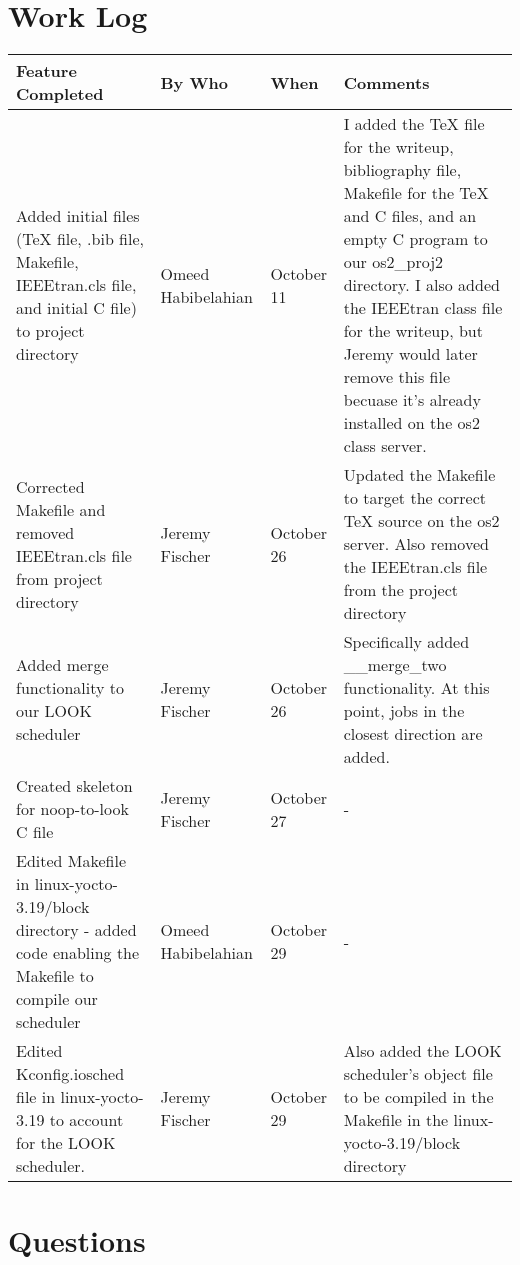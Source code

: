 \documentclass[draftclsnofoot, onecolumn, 10pt, compsoc]{IEEEtran}
\begin{document}
	\section{Work Log}
		\begin{tabular}{| p{4cm} | p{3cm} | p{2cm} | p{8cm} |}
			\hline
			Feature Completed & By Who & When & Comments \\ \hline

			Added initial files (TeX file, .bib file, Makefile, IEEEtran.cls file, and initial C file) to project directory
			& Omeed Habibelahian
			& October 11
			& I added the TeX file for the writeup, bibliography file, Makefile for the TeX and C files, and an empty C
			program to our os2\_proj2 directory. I also added the IEEEtran class file for the writeup, but Jeremy would later
			remove this file becuase it's already installed on the os2 class server.\\
			\hline

			Corrected Makefile and removed IEEEtran.cls file from project directory
			& Jeremy Fischer
			& October 26
			& Updated the Makefile to target the correct TeX source on the os2 server. Also removed the IEEEtran.cls file
			from the project directory \\
			\hline

			Added merge functionality to our LOOK scheduler
			& Jeremy Fischer
			& October 26
			& Specifically added \_\_merge\_two functionality. At this point, jobs in the closest direction are added. \\
			\hline

			Created skeleton for noop-to-look C file
			& Jeremy Fischer
			& October 27
			& - \\
			\hline

			Edited Makefile in linux-yocto-3.19/block directory - added code enabling the Makefile to compile our scheduler
			& Omeed Habibelahian
			& October 29
			& - \\
			\hline

			Edited Kconfig.iosched file in linux-yocto-3.19 to account for the LOOK scheduler.
			& Jeremy Fischer
			& October 29
			& Also added the LOOK scheduler's object file to be compiled in the Makefile in the linux-yocto-3.19/block directory \\
			\hline


		\end{tabular}

	\section{Questions}
\end{document}
